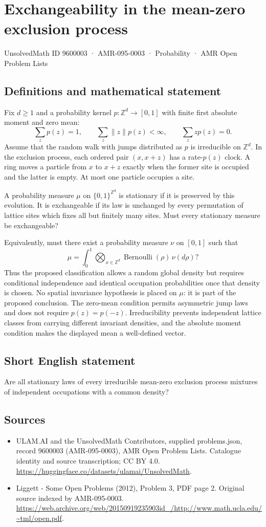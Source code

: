 \documentclass[11pt,a4paper]{article}
\begin{document}
\section*{Exchangeability in the mean-zero exclusion process}\label{9600003}
{\small UnsolvedMath ID 9600003 · AMR-095-0003 · Probability · AMR Open Problem Lists}
\subsection{Definitions and mathematical statement}
Fix $d\ge1$ and a probability kernel $p:\mathbb Z^d\to[0,1]$ with finite first absolute moment and zero mean:
\[
\sum_z p(z)=1,\qquad \sum_z\|z\|p(z)<\infty,
\qquad \sum_z z p(z)=0.
\]
Assume that the random walk with jumps distributed as $p$ is irreducible on $\mathbb Z^d$. In the exclusion process, each ordered pair $(x,x+z)$ has a rate-$p(z)$ clock. A ring moves a particle from $x$ to $x+z$ exactly when the former site is occupied and the latter is empty. At most one particle occupies a site.

A probability measure $\mu$ on $\{0,1\}^{\mathbb Z^d}$ is stationary if it is preserved by this evolution. It is exchangeable if its law is unchanged by every permutation of lattice sites which fixes all but finitely many sites. Must every stationary measure be exchangeable?

Equivalently, must there exist a probability measure $\nu$ on $[0,1]$ such that
\[
\mu=\int_0^1\bigotimes_{x\in\mathbb Z^d}\operatorname{Bernoulli}(\rho)\,\nu(d\rho)?
\]
Thus the proposed classification allows a random global density but requires conditional independence and identical occupation probabilities once that density is chosen. No spatial invariance hypothesis is placed on $\mu$: it is part of the proposed conclusion. The zero-mean condition permits asymmetric jump laws and does not require $p(z)=p(-z)$. Irreducibility prevents independent lattice classes from carrying different invariant densities, and the absolute moment condition makes the displayed mean a well-defined vector.
\subsection{Short English statement}
Are all stationary laws of every irreducible mean-zero exclusion process mixtures of independent occupations with a common density?
\subsection{Sources}
\begin{itemize}
\item[S1] ULAM.AI and the UnsolvedMath Contributors, supplied problems.json, record 9600003 (AMR-095-0003), AMR Open Problem Lists. Catalogue identity and source transcription; CC BY 4.0.
\url{https://huggingface.co/datasets/ulamai/UnsolvedMath}.
\item[S2] Liggett - Some Open Problems (2012), Problem 3, PDF page 2. Original source indexed by AMR-095-0003.
\url{https://web.archive.org/web/20150919235903id_/http://www.math.ucla.edu/~tml/open.pdf}.
\end{itemize}
\end{document}
